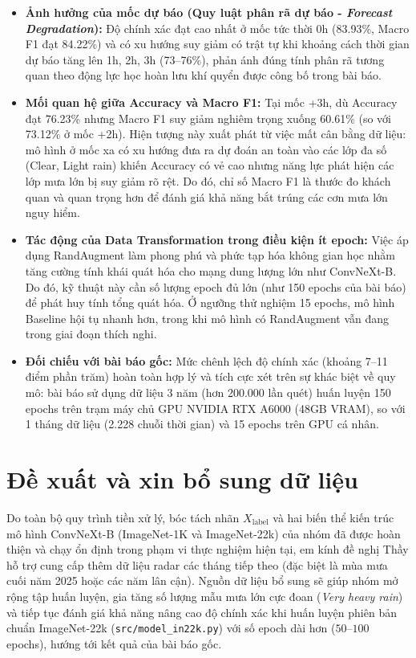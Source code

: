 \documentclass[12pt, a4paper]{article}
\begin{document}
\begin{itemize}
    \item \textbf{Ảnh hưởng của mốc dự báo (Quy luật phân rã dự báo - \textit{Forecast Degradation}):} Độ chính xác đạt cao nhất ở mốc tức thời 0h (83.93\%, Macro F1 đạt 84.22\%) và có xu hướng suy giảm có trật tự khi khoảng cách thời gian dự báo tăng lên 1h, 2h, 3h (73--76\%), phản ánh đúng tính phân rã tương quan theo động lực học hoàn lưu khí quyển được công bố trong bài báo.
    \item \textbf{Mối quan hệ giữa Accuracy và Macro F1:} Tại mốc +3h, dù Accuracy đạt 76.23\% nhưng Macro F1 suy giảm nghiêm trọng xuống 60.61\% (so với 73.12\% ở mốc +2h). Hiện tượng này xuất phát từ việc mất cân bằng dữ liệu: mô hình ở mốc xa có xu hướng đưa ra dự đoán an toàn vào các lớp đa số (Clear, Light rain) khiến Accuracy có vẻ cao nhưng năng lực phát hiện các lớp mưa lớn bị suy giảm rõ rệt. Do đó, chỉ số Macro F1 là thước đo khách quan và quan trọng hơn để đánh giá khả năng bắt trúng các cơn mưa lớn nguy hiểm.
    \item \textbf{Tác động của Data Transformation trong điều kiện ít epoch:} Việc áp dụng RandAugment làm phong phú và phức tạp hóa không gian học nhằm tăng cường tính khái quát hóa cho mạng dung lượng lớn như ConvNeXt-B. Do đó, kỹ thuật này cần số lượng epoch đủ lớn (như 150 epochs của bài báo) để phát huy tính tổng quát hóa. Ở ngưỡng thử nghiệm 15 epochs, mô hình Baseline hội tụ nhanh hơn, trong khi mô hình có RandAugment vẫn đang trong giai đoạn thích nghi.
    \item \textbf{Đối chiếu với bài báo gốc:} Mức chênh lệch độ chính xác (khoảng 7--11 điểm phần trăm) hoàn toàn hợp lý và tích cực xét trên sự khác biệt về quy mô: bài báo sử dụng dữ liệu 3 năm (hơn 200.000 lần quét) huấn luyện 150 epochs trên trạm máy chủ GPU NVIDIA RTX A6000 (48GB VRAM), so với 1 tháng dữ liệu (2.228 chuỗi thời gian) và 15 epochs trên GPU cá nhân.
\end{itemize}

\section{Đề xuất và xin bổ sung dữ liệu}

Do toàn bộ quy trình tiền xử lý, bóc tách nhãn $X_{\mathrm{label}}$ và hai biến thể kiến trúc mô hình ConvNeXt-B (ImageNet-1K và ImageNet-22k) của nhóm đã được hoàn thiện và chạy ổn định trong phạm vi thực nghiệm hiện tại, em kính đề nghị Thầy hỗ trợ cung cấp thêm dữ liệu radar các tháng tiếp theo (đặc biệt là mùa mưa cuối năm 2025 hoặc các năm lân cận). Nguồn dữ liệu bổ sung sẽ giúp nhóm mở rộng tập huấn luyện, gia tăng số lượng mẫu mưa lớn cực đoan (\textit{Very heavy rain}) và tiếp tục đánh giá khả năng nâng cao độ chính xác khi huấn luyện phiên bản chuẩn ImageNet-22k (\texttt{src/model\_in22k.py}) với số epoch dài hơn ($50$--$100$ epochs), hướng tới kết quả của bài báo gốc.
\end{document}
